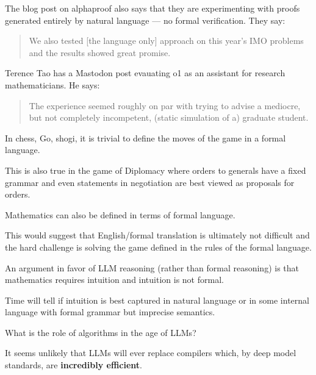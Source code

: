 {

The blog post on alphaproof also says that they are experimenting with proofs generated entirely by natural language --- no formal verification.  They say:

\vfill

\begin{quotation}
We also tested [the language only] approach on this year’s IMO problems and the results showed great promise.
\end{quotation}


Terence Tao has a Mastodon post evauating o1 as an assistant for research mathematicians. He says:

\vfill
\begin{quotation}
The experience seemed roughly on par with trying to advise a mediocre, but not completely incompetent, (static simulation of a) graduate student.
\end{quotation}


In chess, Go, shogi, it is trivial to define the moves of the game in a formal language.

\vfill
This is also true in the game of Diplomacy where orders to generals have a fixed grammar and even statements
in negotiation are best viewed as proposals for orders.

\vfill
Mathematics can also be defined in terms of formal language.

\vfill
This would suggest that English/formal translation is ultimately not difficult and the
hard challenge is solving the game defined in the rules of the formal language.


An argument in favor of LLM reasoning (rather than formal reasoning) is that mathematics requires intuition and intuition is not formal.

\vfill
Time will tell if intuition is best captured in natural language or in some internal language with formal grammar but imprecise semantics.


What is the role of algorithms in the age of LLMs?

\vfill
It seems unlikely that LLMs will ever replace compilers which, by deep model standards, are {\bf incredibly efficient}.

}
